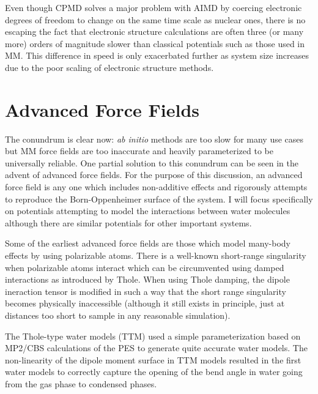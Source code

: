 \documentclass[11pt, proquest]{uwthesis}[2020/02/24]
\let\ce\ch
\begin{document}
\par Even though CPMD solves a major problem with AIMD by coercing electronic degrees of freedom to change on the same time scale as nuclear ones, there is no escaping the fact that electronic structure calculations are often three (or many more) orders of magnitude slower than classical potentials such as those used in MM. This difference in speed is only exacerbated further as system size increases due to the poor scaling of electronic structure methods.

\section{Advanced Force Fields}

\par The conundrum is clear now: \textit{ab initio} methods are too slow for many use cases but MM force fields are too inaccurate and heavily parameterized to be universally reliable. One partial solution to this conundrum can be seen in the advent of advanced force fields. For the purpose of this discussion, an advanced force field is any one which includes non-additive effects and rigorously attempts to reproduce the Born-Oppenheimer surface of the system. I will focus specifically on potentials attempting to model the interactions between water molecules although there are similar potentials for other important systems.

\par Some of the earliest advanced force fields are those which model many-body effects by using polarizable atoms. There is a well-known short-range singularity when polarizable atoms interact which can be circumvented using damped interactions as introduced by Thole\autocite{thole_molecular_1981}. When using Thole damping, the dipole ineraction tensor is modified in such a way that the short range singularity becomes physically inaccessible (although it still exists in principle, just at distances too short to sample in any reasonable simulation).

\par The Thole-type water models (TTM) used a simple parameterization based on MP2/CBS calculations of the \ce{(H2O)2} PES to generate quite accurate water models\autocite{burnham_development_2002,burnham_development_2002-1,fanourgakis_flexible_2006,fanourgakis_development_2008}. The non-linearity of the dipole moment surface in TTM models resulted in the first water models to correctly capture the opening of the bend angle in water going from the gas phase to condensed phases\autocite{fanourgakis_bend_2006}.
\end{document}
